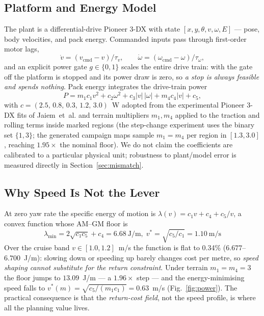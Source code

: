 \documentclass[preprint,12pt]{elsarticle}
\begin{document}
\subsection{Platform and Energy Model}
The plant is a differential-drive Pioneer 3-DX with state
$[x, y, \theta, v, \omega, E]$ --- pose, body velocities, and pack
energy. Commanded inputs pass through first-order motor lags,
\begin{equation}
\dot v = (v_{\mathrm{cmd}} - v)/\tau_v, \qquad
\dot\omega = (\omega_{\mathrm{cmd}} - \omega)/\tau_\omega,
\label{eq:lag}
\end{equation}
and an explicit power gate $g \in \{0,1\}$ scales the entire drive
train: with the gate off the platform is stopped and its power draw is
zero, so \emph{a stop is always feasible and spends nothing}. Pack
energy integrates the drive-train power
\begin{equation}
P = m_1 c_1 v^{2} + c_2 \omega^{2} + c_3 |v|\,|\omega|
    + m_4 c_4 |v| + c_5,
\label{eq:power}
\end{equation}
with $c = (2.5,\,0.8,\,0.3,\,1.2,\,3.0)$~W adopted from the
experimental Pioneer 3-DX fits of Jaiem~et~al. \cite{jaiem2021energy}
and terrain multipliers $m_1, m_4$ applied to the traction
and rolling terms inside marked regions (the step-change experiment
uses the binary set $\{1,3\}$; the generated campaign maps sample
$m_1 = m_4$ per region in $[1.3, 3.0]$, reaching $1.95\times$ the
nominal floor). We do not claim the
coefficients are calibrated to a particular physical unit; robustness
to plant/model error is measured directly in
Section~\ref{sec:mismatch}.

\subsection{Why Speed Is Not the Lever}
At zero yaw rate the specific energy of motion is
$\lambda(v) = c_1 v + c_4 + c_5/v$, a convex function whose
AM--GM floor is
\begin{equation}
\lambda_{\min} = 2\sqrt{c_1 c_5} + c_4 = 6.68~\mathrm{J/m},\;
v^{*} = \sqrt{c_5/c_1} = 1.10~\mathrm{m/s}
\label{eq:lambdamin}
\end{equation}
Over the cruise band $v \in [1.0, 1.2]$~m/s the function is flat to
0.34\% ($6.677$--$6.700$~J/m): slowing down or speeding up barely
changes cost per metre, so \emph{speed shaping cannot substitute for
the return constraint}. Under terrain $m_1 = m_4 = 3$ the floor jumps
to $13.09$~J/m --- a $1.96\times$ step --- and the energy-minimising
speed falls to $v^{*}(m) = \sqrt{c_5/(m_1 c_1)} = 0.63$~m/s
(Fig.~\ref{fig:power}). The practical consequence is that the
\emph{return-cost field}, not the speed profile, is where all the
planning value lives.
\end{document}

